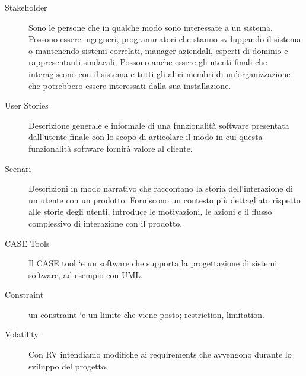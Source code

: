 \documentclass{article}
\begin{document}
\begin{description}
		\item[Stakeholder] Sono le persone che in qualche modo sono interessate a un
		sistema. Possono essere ingegneri, programmatori che stanno sviluppando
		il sistema o mantenendo sistemi correlati, manager aziendali, esperti di
		dominio e rappresentanti sindacali. Possono anche essere gli utenti finali
		che interagiscono con il sistema e tutti gli altri membri di un'organizzazione
		che potrebbero essere interessati dalla sua installazione.
		\item[User Stories] Descrizione generale e informale di una funzionalità software presentata
		dall'utente finale con lo scopo di articolare il modo in cui questa
		funzionalità software fornirà valore al cliente.
		\item[Scenari] Descrizioni in modo narrativo che raccontano la storia dell'interazione di
		un utente con un prodotto. Forniscono un contesto più dettagliato rispetto
		alle storie degli utenti, introduce le motivazioni, le azioni e il flusso
		complessivo di interazione con il prodotto.
		\item[CASE Tools] Il CASE tool `e un software che supporta la progettazione di sistemi software, ad esempio con UML.
		\item[Constraint] un constraint `e un limite che viene posto; restriction, limitation.
		\item[Volatility] Con RV intendiamo modifiche ai requirements che avvengono durante lo sviluppo del progetto.
	\end{description}
	
\end{document}
